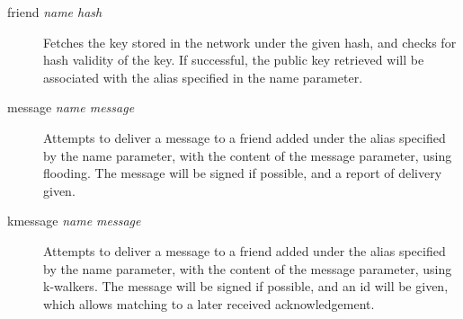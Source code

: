 \begin{description}
\item[friend \textit{name hash}]
Fetches the key stored in the network under the given hash, and checks for hash validity of the key. If successful, the public key retrieved will be associated with the alias specified in the name parameter.

\item[message \textit{name message}]
Attempts to deliver a message to a friend added under the alias specified by the name parameter, with the content of the message parameter, using flooding.
The message will be signed if possible, and a report of delivery given.

\item[kmessage \textit{name message}]
Attempts to deliver a message to a friend added under the alias specified by the name parameter, with the content of the message parameter, using k-walkers.
The message will be signed if possible, and an id will be given, which allows matching to a later received acknowledgement.

\end{description}